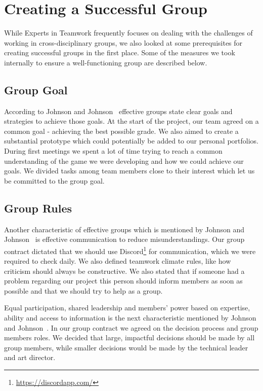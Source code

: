 \chapter{Creating a Successful Group}
While Experts in Teamwork frequently focuses on dealing with the challenges of working in cross-disciplinary groups, we also looked at some prerequisites for creating successful groups in the first place. Some of the measures we took internally to ensure a well-functioning group are described below. 
\section{Group Goal}
According to Johnson and Johnson~\cite{2013johnson} effective groups state clear goals and strategies to achieve those goals. At the start of the project, our team agreed on a common goal - achieving the best possible grade. We also aimed to create a substantial prototype which could potentially be added to our personal portfolios. During first meetings we spent a lot of time trying to reach a common understanding of the game we were developing and how we could achieve our goals. We divided tasks among team members close to their interest which let us be committed to the group goal. 
\section{Group Rules}
Another characteristic of effective groups which is mentioned by Johnson and Johnson~\cite{2013johnson} is effective communication to reduce misunderstandings. 
Our group contract dictated that we should use Discord\footnote{\url{https://discordapp.com/}} for communication, which we were required to check daily. We also defined teamwork climate rules, like how criticism should always be constructive. 
We also stated that if someone had a problem regarding our project this person should inform members as soon as possible and that we should try to help as a group. 

Equal participation, shared leadership and members’ power based on expertise, ability and access to information is the next characteristic mentioned by Johnson and Johnson~\cite{2013johnson}.
In our group contract we agreed on the decision process and group members roles.
We decided that large, impactful decisions should be made by all group members, while smaller decisions would be made by the technical leader and art director.
